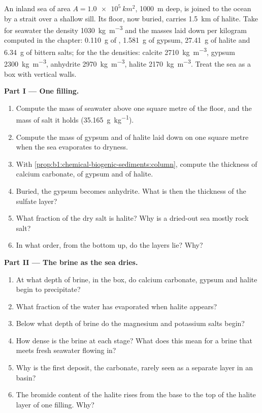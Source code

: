 \begin{problem}
\label{pb:b1:chemical-biogenic-sediments:1}
An inland sea of area $A = \qty{1.0e5}{km^2}$, \qty{1000}{m} deep, is joined to
the ocean by a strait over a shallow sill. Its floor, now buried, carries
\qty{1.5}{km} of halite. Take for seawater the density \qty{1030}{kg.m^{-3}} and
the masses laid down per kilogram computed in the chapter: \qty{0.110}{g} of
, \qty{1.581}{g} of gypsum, \qty{27.41}{g} of halite and
\qty{6.34}{g} of bittern salts; for the  the densities: calcite
\qty{2710}{kg.m^{-3}}, gypsum \qty{2300}{kg.m^{-3}}, anhydrite
\qty{2970}{kg.m^{-3}}, halite \qty{2170}{kg.m^{-3}}. Treat the sea as a box with
vertical walls.

\medskip
\noindent\textbf{Part I --- One filling.}
\begin{enumerate}
  \item Compute the mass of seawater above one square metre of the floor, and
        the mass of salt it holds (\qty{35.165}{g.kg^{-1}}).
  \item Compute the mass of gypsum and of halite laid down on one square metre
        when the sea evaporates to dryness.
  \item With \cref{prop:b1:chemical-biogenic-sediments:column}, compute the
        thickness of calcium carbonate, of gypsum and of halite.
  \item Buried, the gypsum becomes anhydrite. What is then the thickness of the
        sulfate layer?
  \item What fraction of the dry salt is halite? Why is a dried-out sea mostly
        rock salt?
  \item In what order, from the bottom up, do the layers lie? Why?
\end{enumerate}

\noindent\textbf{Part II --- The brine as the sea dries.}
\begin{enumerate}[resume]
  \item At what depth of brine, in the box, do calcium carbonate, gypsum and
        halite begin to precipitate?
  \item What fraction of the water has evaporated when halite appears?
  \item Below what depth of brine do the magnesium and potassium salts begin?
  \item How dense is the brine at each stage? What does this mean for a brine
        that meets fresh seawater flowing in?
  \item Why is the first deposit, the carbonate, rarely seen as a separate
        layer in an  basin?
  \item The bromide content of the halite rises from the base to the top of
        the halite layer of one filling. Why?
\end{enumerate}


\end{problem}
